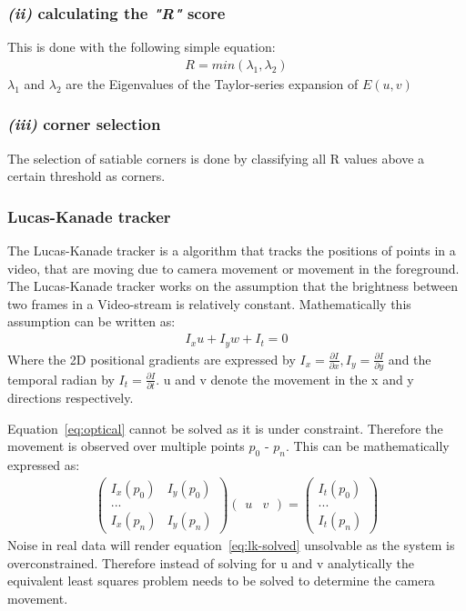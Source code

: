 \documentclass[11pt,a4paper]{article}
\begin{document}
\subsubsection*{\emph{(ii)} calculating the \textit{"R"} score} 

This is done with the following simple equation:
\begin{align}
   R = min(\lambda_1, \lambda_2) 
\end{align}
$\lambda_1$ and $\lambda_2$ are the Eigenvalues of the Taylor-series expansion of $E(u,v)$
\subsubsection*{\emph{(iii)} corner selection} 
The selection of satiable corners is done by classifying all R values above a certain threshold as corners.

\subsubsection{Lucas-Kanade tracker} \label{Sec:Lucas-Kanade}
The Lucas-Kanade tracker is a algorithm that tracks the positions of points in a video, that are moving due to camera movement or movement in the foreground.
The Lucas-Kanade tracker works on the assumption that the brightness between two frames in a Video-stream is relatively constant. 
Mathematically this assumption can be written as:
\begin{align} \label{eq:optical}
        I_x u + I_y w + I_t = 0 
    \end{align}
Where the 2D positional gradients are expressed by $I_x = \frac {\partial I} {\partial x}, I_y = \frac {\partial I} {\partial y}
$ and the temporal radian by $I_t = \frac {\partial I}{\partial t}$.
u and v denote the movement in the x and y directions respectively.

Equation~\ref{eq:optical} cannot be solved as it is under constraint.
Therefore the movement is observed over multiple points $p_0$ - $p_n$.
This can be mathematically expressed as:
\begin{align} \label{eq:lk-solved}
    \begin{pmatrix}
        I_x(p_0) & I_y(p_0) \\  ... \\ I_x(p_n) & I_y(p_n)
    \end{pmatrix} 
    \begin{pmatrix}
       u & v
    \end{pmatrix} = 
    \begin{pmatrix}
        I_t(p_0) \\  ... \\ I_t(p_n) 
    \end{pmatrix} 
\end{align}
Noise in real data will render equation~\ref{eq:lk-solved} unsolvable as the system is overconstrained.
Therefore instead of solving for u and v analytically the equivalent least squares problem needs to be solved to determine the camera movement.
\end{document}
